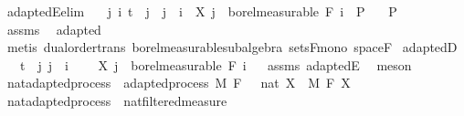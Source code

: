 \begin{isabellebody}
\isanewline
\isanewline
{}\isamarkupfalse%
\ adaptedE{\isacharbrackleft}{\kern0pt}elim{\isacharbrackright}{\kern0pt}{\isacharcolon}{\kern0pt}\isanewline
\ \ \ {\isachardoublequoteopen}{\isasymlbrakk}{\isasymAnd}j\ i{\isachardot}{\kern0pt}\ t\ {\isasymle}\ j\ {\isasymLongrightarrow}\ j\ {\isasymle}\ i\ {\isasymLongrightarrow}\ X\ j\ {\isasymin}\ borel{\isacharunderscore}{\kern0pt}measurable\ {\isacharparenleft}{\kern0pt}F\ i{\isacharparenright}{\kern0pt}{\isasymrbrakk}\ {\isasymLongrightarrow}\ P{\isachardoublequoteclose}\isanewline
\ \ \ P\isanewline
%
\isadelimproof
\ \ %
\endisadelimproof
%
\isatagproof
{}\isamarkupfalse%
\ assms\ \isamarkupfalse%
\ adapted\ \isamarkupfalse%
\ {\isacharparenleft}{\kern0pt}metis\ dual{\isacharunderscore}{\kern0pt}order{\isachardot}{\kern0pt}trans\ borel{\isacharunderscore}{\kern0pt}measurable{\isacharunderscore}{\kern0pt}subalgebra\ sets{\isacharunderscore}{\kern0pt}F{\isacharunderscore}{\kern0pt}mono\ space{\isacharunderscore}{\kern0pt}F{\isacharparenright}{\kern0pt}%
\endisatagproof
{\isafoldproof}%
%
\isadelimproof
\isanewline
%
\endisadelimproof
\isanewline
{}\isamarkupfalse%
\ adaptedD{\isacharcolon}{\kern0pt}\isanewline
\ \ \ {\isachardoublequoteopen}t\ {\isasymle}\ j{\isachardoublequoteclose}\ {\isachardoublequoteopen}j\ {\isasymle}\ i{\isachardoublequoteclose}\ \isanewline
\ \ \ {\isachardoublequoteopen}X\ j\ {\isasymin}\ borel{\isacharunderscore}{\kern0pt}measurable\ {\isacharparenleft}{\kern0pt}F\ i{\isacharparenright}{\kern0pt}{\isachardoublequoteclose}%
\isadelimproof
\ %
\endisadelimproof
%
\isatagproof
{}\isamarkupfalse%
\ assms\ adaptedE\ \isamarkupfalse%
\ meson%
\endisatagproof
{\isafoldproof}%
%
\isadelimproof
%
\endisadelimproof
\isanewline
\isanewline
{}\isamarkupfalse%
\isanewline
\isanewline
{}\isamarkupfalse%
\ nat{\isacharunderscore}{\kern0pt}adapted{\isacharunderscore}{\kern0pt}process\ {\isacharequal}{\kern0pt}\ adapted{\isacharunderscore}{\kern0pt}process\ M\ F\ {\isachardoublequoteopen}{}\ {\isacharcolon}{\kern0pt}{\isacharcolon}{\kern0pt}\ nat{\isachardoublequoteclose}\ X\ \ M\ F\ X\isanewline
{}\isamarkupfalse%
\ nat{\isacharunderscore}{\kern0pt}adapted{\isacharunderscore}{\kern0pt}process\ {\isasymsubseteq}\ nat{\isacharunderscore}{\kern0pt}filtered{\isacharunderscore}{\kern0pt}measure%

\end{isabellebody}
